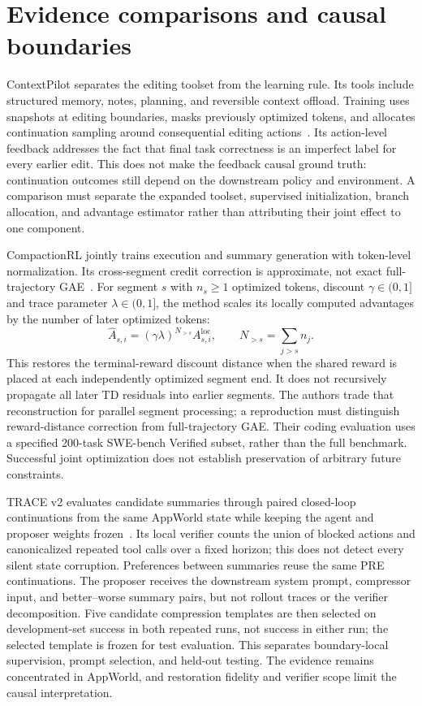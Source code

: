 \section{Evidence comparisons and causal boundaries}\label{sec:C12:evidence}
ContextPilot separates the editing toolset from the learning rule. Its tools include structured memory, notes, planning, and reversible context offload. Training uses snapshots at editing boundaries, masks previously optimized tokens, and allocates continuation sampling around consequential editing actions~\cite{pan2026contextpilot}. Its action-level feedback addresses the fact that final task correctness is an imperfect label for every earlier edit. This does not make the feedback causal ground truth: continuation outcomes still depend on the downstream policy and environment. A comparison must separate the expanded toolset, supervised initialization, branch allocation, and advantage estimator rather than attributing their joint effect to one component.

CompactionRL jointly trains execution and summary generation with token-level normalization. Its cross-segment credit correction is approximate, not exact full-trajectory GAE~\cite{li2026compactionrl}. For segment $s$ with $n_s\geq1$ optimized tokens, discount $\gamma\in(0,1]$ and trace parameter $\lambda\in(0,1]$, the method scales its locally computed advantages by the number of later optimized tokens:
\begin{equation}
 \widehat A_{s,i}=(\gamma\lambda)^{N_{>s}}A^{\mathrm{loc}}_{s,i},
 \qquad N_{>s}=\sum_{j>s}n_j.
 \label{eq:C12:compactionrl-position}
\end{equation}
This restores the terminal-reward discount distance when the shared reward is placed at each independently optimized segment end. It does not recursively propagate all later TD residuals into earlier segments. The authors trade that reconstruction for parallel segment processing; a reproduction must distinguish reward-distance correction from full-trajectory GAE. Their coding evaluation uses a specified 200-task SWE-bench Verified subset, rather than the full benchmark. Successful joint optimization does not establish preservation of arbitrary future constraints.

TRACE v2 evaluates candidate summaries through paired closed-loop continuations from the same AppWorld state while keeping the agent and proposer weights frozen~\cite{cumulative_a_trace_v2_20261029}. Its local verifier counts the union of blocked actions and canonicalized repeated tool calls over a fixed horizon; this does not detect every silent state corruption. Preferences between summaries reuse the same PRE continuations. The proposer receives the downstream system prompt, compressor input, and better--worse summary pairs, but not rollout traces or the verifier decomposition. Five candidate compression templates are then selected on development-set success in both repeated runs, not success in either run; the selected template is frozen for test evaluation. This separates boundary-local supervision, prompt selection, and held-out testing. The evidence remains concentrated in AppWorld, and restoration fidelity and verifier scope limit the causal interpretation.

